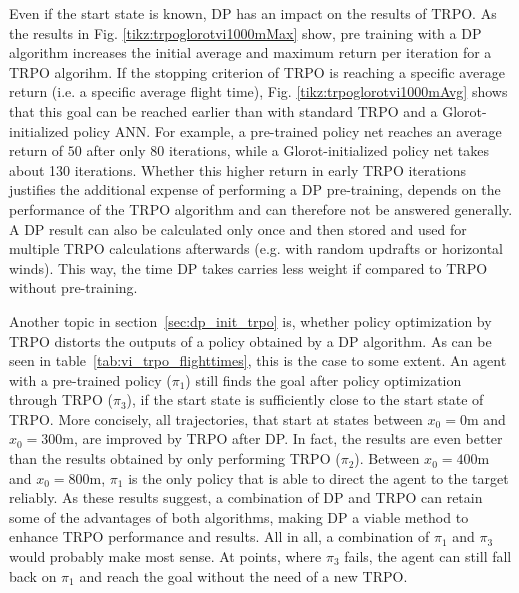 Even if the start state is known, DP has an impact on the results of TRPO. As the results in Fig. \ref{tikz:trpoglorotvi1000mMax} show, pre training with a DP algorithm increases the initial average and maximum return per iteration for a TRPO algorihm. If the stopping criterion of TRPO is reaching a specific average return (i.e. a specific average flight time), Fig. \ref{tikz:trpoglorotvi1000mAvg} shows that this goal can be reached earlier than with standard TRPO and a Glorot-initialized policy ANN. For example, a pre-trained policy net reaches an average return of $50$ after only 80 iterations, while a Glorot-initialized policy net takes about 130 iterations. Whether this higher return in early TRPO iterations justifies the additional expense of performing a DP pre-training, depends on the performance of the TRPO algorithm and can therefore not be answered generally. A DP result can also be calculated only once and then stored and used for multiple TRPO calculations afterwards (e.g. with random updrafts or horizontal winds). This way, the time DP takes carries less weight if compared to TRPO without pre-training.

Another topic in section~\ref{sec:dp_init_trpo} is, whether policy optimization by TRPO distorts the outputs of a policy obtained by a DP algorithm. As can be seen in table~\ref{tab:vi_trpo_flighttimes}, this is the case to some extent. An agent with a pre-trained policy ($\pi_1$) still finds the goal after policy optimization through TRPO ($\pi_3$), if the start state is sufficiently close to the start state of TRPO. More concisely, all trajectories, that start at states between $x_0 = 0\text{m}$ and $x_0 = 300\text{m}$, are improved by TRPO after DP. In fact, the results are even better than the results obtained by only performing TRPO ($\pi_2$). Between $x_0 = 400\text{m}$ and $x_0 = 800\text{m}$, $\pi_1$ is the only policy that is able to direct the agent to the target reliably. 
As these results suggest, a combination of DP and TRPO can retain some of the advantages of both algorithms, making DP a viable method to enhance TRPO performance and results. All in all, a combination of $\pi_1$ and $\pi_3$ would probably make most sense. At points, where $\pi_3$ fails, the agent can still fall back on $\pi_1$ and reach the goal without the need of a new TRPO.